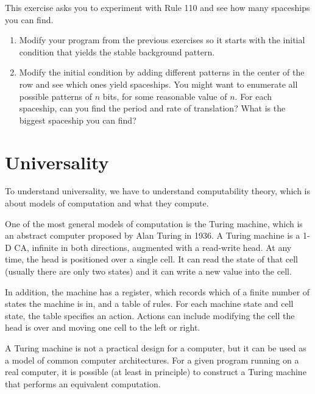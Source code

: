 \documentclass[10pt]{book}
\begin{document}
\begin{ex}

This exercise asks you to experiment with Rule 110 and see how
many spaceships you can find.

\begin{enumerate}

\item Modify your program from the previous exercises so it
starts with the initial condition that yields the stable
background pattern.

\item Modify the initial condition by adding different patterns in the
  center of the row and see which ones yield spaceships.  You might
  want to enumerate all possible patterns of $n$ bits, for some
  reasonable value of $n$.  For each spaceship, can you find the
  period and rate of translation?  What is the biggest spaceship you
  can find?

\end{enumerate}

\end{ex}


\section{Universality}

To understand universality, we have to understand
computability theory, which is about models of
computation and what they compute.

One of the most general models of computation is the Turing machine,
which is an abstract computer proposed by 
Alan Turing in 1936.  A Turing machine is a 1-D CA, infinite in both
directions, augmented with a read-write head.  At any time, the head
is positioned over a single cell.  It can read the state of that cell
(usually there are only two states) and it can write a new value into
the cell.

In addition, the machine has a register, which records which
of a finite number of states the machine is in, and a table
of rules.  For each machine state and cell state, the table
specifies an action.  Actions can include modifying the cell
the head is over and moving one cell to the left or right.

A Turing machine is not a practical design for a computer, but it
can be used as a model of common computer architectures.  For
a given program running on a real computer, it is possible
(at least in principle) to construct a Turing machine that performs
an equivalent computation.
\end{document}
